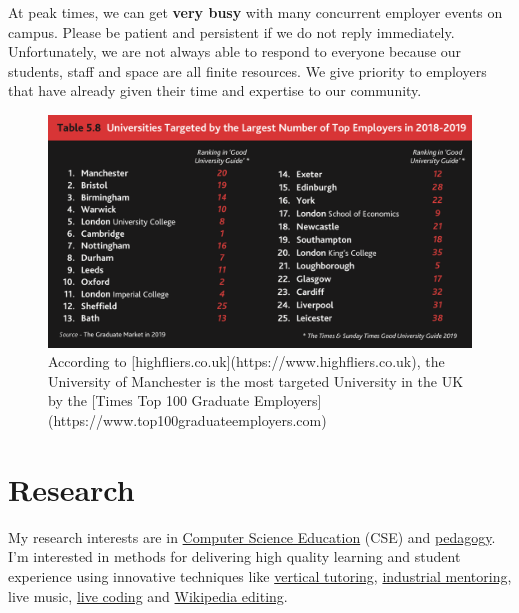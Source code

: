 \documentclass[12pt,]{book}
\begin{document}
At peak times, we can get \textbf{very busy} with many concurrent employer events on campus. Please be patient and persistent if we do not reply immediately. Unfortunately, we are not always able to respond to everyone because our students, staff and space are all finite resources. We give priority to employers that have already given their time and expertise to our community.

\begin{figure}

{\centering \includegraphics[width=1\linewidth]{images/high-fliers-table} 

}

\caption{According to [highfliers.co.uk](https://www.highfliers.co.uk), the University of Manchester is the most targeted University in the UK by the [Times Top 100 Graduate Employers](https://www.top100graduateemployers.com)}\label{fig:unnamed-chunk-5}
\end{figure}

\hypertarget{research}{%
\chapter{Research}\label{research}}

My research interests are in \href{https://scholar.google.com/citations?view_op=search_authors\&hl=en\&mauthors=label:computer_science_education}{Computer Science Education} (CSE) and \href{https://en.wikipedia.org/wiki/Pedagogy}{pedagogy}. I'm interested in methods for delivering high quality learning and student experience using innovative techniques like \protect\hyperlink{vertical-tutoring-1}{vertical tutoring}, \href{https://www.cs.manchester.ac.uk/connect/business-engagement/industrial-mentoring/}{industrial mentoring}, live music, \href{https://en.wikipedia.org/wiki/Live_coding}{live coding} and \protect\hyperlink{wikipedia}{Wikipedia editing}.
\end{document}

